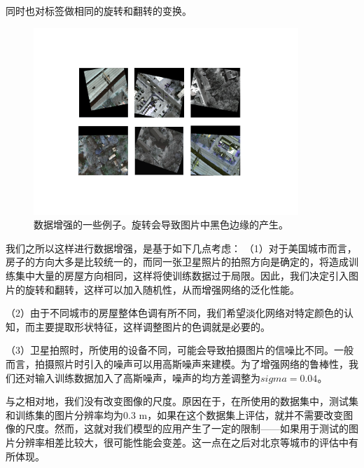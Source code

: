 \documentclass[a4paper,12pt]{article}
\begin{document}
\begin{CJK*}{UTF8}{gbsn}
\begin{spacing}{1.2}
    同时也对标签做相同的旋转和翻转的变换。\\
    \begin{figure} [!]
    \centering
    \includegraphics[width=10.0cm]{DataAug.pdf}
    \caption{数据增强的一些例子。旋转会导致图片中黑色边缘的产生。}
    \label{fig:Fig 1}
    \end{figure}\par
    我们之所以这样进行数据增强，是基于如下几点考虑：
    （1）对于美国城市而言，房子的方向大多是比较统一的，而同一张卫星照片的拍照方向是确定的，将造成训练集中大量的房屋方向相同，这样将使训练数据过于局限。因此，我们决定引入图片的旋转和翻转，这样可以加入随机性，从而增强网络的泛化性能。
    
    （2）由于不同城市的房屋整体色调有所不同，我们希望淡化网络对特定颜色的认知，而主要提取形状特征，这样调整图片的色调就是必要的。
    
    （3）卫星拍照时，所使用的设备不同，可能会导致拍摄图片的信噪比不同。一般而言，拍摄照片时引入的噪声可以用高斯噪声来建模。为了增强网络的鲁棒性，我们还对输入训练数据加入了高斯噪声，噪声的均方差调整为$sigma=0.04$。
    
    与之相对地，我们没有改变图像的尺度。原因在于，在所使用的数据集中，测试集和训练集的图片分辨率均为$0.3$ m，如果在这个数据集上评估，就并不需要改变图像的尺度。然而，这就对我们模型的应用产生了一定的限制——如果用于测试的图片分辨率相差比较大，很可能性能会变差。这一点在之后对北京等城市的评估中有所体现。





\end{spacing}
\end{CJK*}
\end{document}
